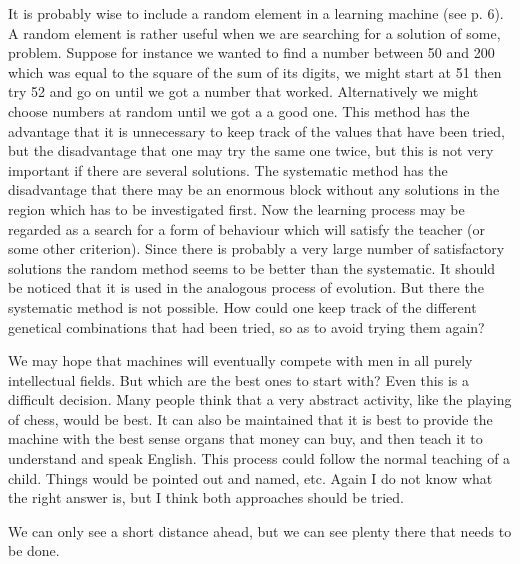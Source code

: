     It is probably wise to include a random element in a learning machine (see p. 6). A random element is rather useful when we are searching for a solution of some, problem. Suppose for instance we wanted to find a number between 50 and 200 which was equal to the square of the sum of its digits, we might start at 51 then try 52 and go on until we got a number that worked. Alternatively we might choose numbers at random until we got a a good one. This method has the advantage that it is unnecessary to keep track of the values that have been tried, but the disadvantage that one may try the same one twice, but this is not very important if there are several solutions. The systematic method has the disadvantage that there may be an enormous block without any solutions in the region which has to be investigated first. Now the learning process may be regarded as a search for a form of behaviour which will satisfy the teacher (or some other criterion). Since there is probably a very large number of satisfactory solutions the random method seems to be better than the systematic. It should be noticed that it is used in the analogous process of evolution. But there the systematic method is not possible. How could one keep track of the different genetical combinations that had been tried, so as to avoid trying them again?

    We may hope that machines will eventually compete with men in all purely intellectual fields. But which are the best ones to start with? Even this is a difficult decision. Many people think that a very abstract activity, like the playing of chess, would be best. It can also be maintained that it is best to provide the machine with the best sense organs that money can buy, and then teach it to understand and speak English. This process could follow the normal teaching of a child. Things would be pointed out and named, etc. Again I do not know what the right answer is, but I think both approaches should be tried.

    We can only see a short distance ahead, but we can see plenty there that needs to be done.